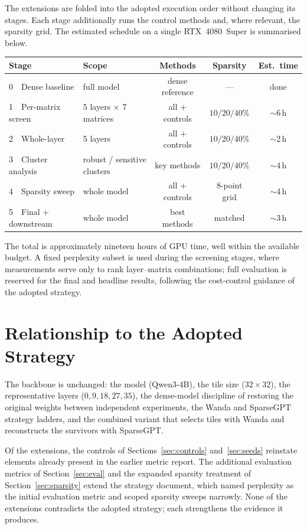 \documentclass[11pt]{article}
\begin{document}
The extensions are folded into the adopted execution order without changing its stages. Each stage
additionally runs the control methods and, where relevant, the sparsity grid. The estimated schedule on a
single RTX~4080~Super is summarised below.

\begin{table}[h]
\centering
\small
\begin{tabular}{@{}llccc@{}}
\toprule
Stage & Scope & Methods & Sparsity & Est.\ time \\
\midrule
0\ \ Dense baseline    & full model                  & dense reference & ---          & done \\
1\ \ Per-matrix screen & 5 layers $\times$ 7 matrices & all + controls  & $10/20/40\%$ & $\sim$6\,h \\
2\ \ Whole-layer       & 5 layers                    & all + controls  & $10/20/40\%$ & $\sim$2\,h \\
3\ \ Cluster analysis  & robust / sensitive clusters & key methods     & $10/20/40\%$ & $\sim$4\,h \\
4\ \ Sparsity sweep    & whole model                 & all + controls  & 8-point grid & $\sim$4\,h \\
5\ \ Final + downstream& whole model                 & best methods    & matched      & $\sim$3\,h \\
\bottomrule
\end{tabular}
\end{table}

The total is approximately nineteen hours of GPU time, well within the available budget. A fixed perplexity
subset is used during the screening stages, where measurements serve only to rank layer--matrix
combinations; full evaluation is reserved for the final and headline results, following the cost-control
guidance of the adopted strategy.

\section{Relationship to the Adopted Strategy}

The backbone is unchanged: the model (Qwen3-4B), the tile size ($32\times32$), the representative layers
($0, 9, 18, 27, 35$), the dense-model discipline of restoring the original weights between independent
experiments, the Wanda and SparseGPT strategy ladders, and the combined variant that selects tiles with
Wanda and reconstructs the survivors with SparseGPT.

Of the extensions, the controls of Sections~\ref{sec:controls} and~\ref{sec:seeds} reinstate elements
already present in the earlier metric report. The additional evaluation metrics of Section~\ref{sec:eval}
and the expanded sparsity treatment of Section~\ref{sec:sparsity} extend the strategy document, which named
perplexity as the initial evaluation metric and scoped sparsity sweeps narrowly. None of the extensions
contradicts the adopted strategy; each strengthens the evidence it produces.
\end{document}
